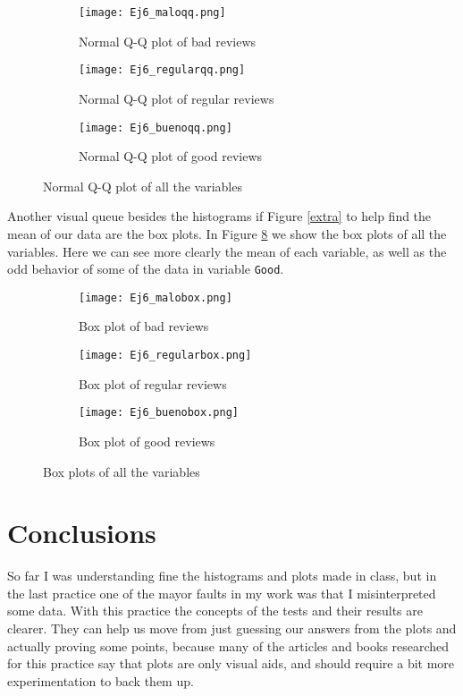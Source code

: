 \documentclass{article}
\begin{document}
\begin{figure}[]
\begin{subfigure}{.3\textwidth}
  \centering
  \texttt{[image: Ej6\_maloqq.png]}  
  \caption{Normal Q-Q plot of bad reviews }
  \label{sf1}
\end{subfigure}
\begin{subfigure}{.3\textwidth}
  \centering
  \texttt{[image: Ej6\_regularqq.png]}  
  \caption{Normal Q-Q plot of regular reviews}
  \label{sf2}
\end{subfigure}
\begin{subfigure}{.3\textwidth}
  \centering
  \texttt{[image: Ej6\_buenoqq.png]}  
  \caption{Normal Q-Q plot of good reviews}
  \label{sf3}
\end{subfigure}
\caption{Normal Q-Q plot of all the variables}
\label{fig9}
\end{figure}


Another visual queue besides the histograms if Figure \ref{extra} to help find the mean of our data are the box plots. In Figure \ref{fig99} we show the box plots of all the variables. Here we can see more clearly the mean of each variable, as well as the odd behavior of some of the data in variable \texttt{Good}.\\

\begin{figure}[]
\begin{subfigure}{.3\textwidth}
  \centering
  \texttt{[image: Ej6\_malobox.png]}  
  \caption{Box plot of bad reviews }
  \label{sf91}
\end{subfigure}
\begin{subfigure}{.3\textwidth}
  \centering
  \texttt{[image: Ej6\_regularbox.png]}  
  \caption{Box plot of regular reviews}
  \label{sf92}
\end{subfigure}
\begin{subfigure}{.3\textwidth}
  \centering
  \texttt{[image: Ej6\_buenobox.png]}  
  \caption{Box plot of good reviews}
  \label{sf93}
\end{subfigure}
\caption{Box plots of all the variables}
\label{fig99}
\end{figure}

\section{Conclusions}

So far I was understanding fine the histograms and plots made in class, but in the last practice one of the mayor faults in my work was that I misinterpreted some data. With this practice the concepts of the tests and their results are clearer. They can help us move from just guessing our answers from the plots and actually proving some points, because many of the articles and books researched for this practice say that plots are only visual aids, and should require a bit more experimentation to back them up.\\





 
\end{document}
